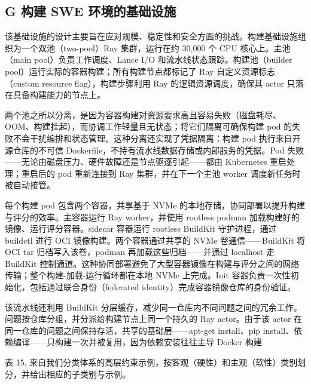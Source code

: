 \subsection{G 构建 SWE 环境的基础设施}\label{g-infrastructure-for-building-swe-environments}

该基础设施的设计主要旨在应对规模、稳定性和安全方面的挑战。构建基础设施组织为一个双池（two-pool）Ray 集群，运行在约 30,000 个 CPU 核心上。主池（main pool）负责工作调度、Lance I/O 和流水线状态跟踪。构建池（builder pool）运行实际的容器构建；所有构建节点都标记了 Ray 自定义资源标志（custom resource flag），构建步骤利用 Ray 的逻辑资源调度，确保其 actor 只落在具备构建能力的节点上。

两个池之所以分离，是因为容器构建对资源要求高且容易失败（磁盘耗尽、OOM、构建挂起），而协调工作轻量且无状态；将它们隔离可确保构建 pod 的失败不会干扰编排和状态管理。这种分离还实现了凭据隔离：构建 pod 执行来自开源仓库的不可信 Dockerfile，不持有流水线数据存储或内部服务的凭据。Pod 失败——无论由磁盘压力、硬件故障还是节点驱逐引起——都由 Kubernetes 重启处理；重启后的 pod 重新连接到 Ray 集群，并在下一个主池 worker 调度新任务时被自动接管。

每个构建 pod 包含两个容器，共享基于 NVMe 的本地存储，协同部署以提升构建与评分的效率。主容器运行 Ray worker，并使用 rootless podman 加载构建好的镜像、运行评分容器。sidecar 容器运行 rootless BuildKit 守护进程，通过 buildctl 进行 OCI 镜像构建。两个容器通过共享的 NVMe 卷通信——BuildKit 将 OCI tar 归档写入该卷，podman 再加载这些归档——并通过 localhost 走 BuildKit 控制通道。这种协同部署避免了大型容器镜像在构建与评分之间的网络传输；整个构建-加载-运行循环都在本地 NVMe 上完成。Init 容器负责一次性初始化，包括通过联合身份（federated identity）完成容器镜像仓库的身份验证。

该流水线还利用 BuildKit 分层缓存，减少同一仓库内不同问题之间的冗余工作。问题按仓库分组，并分派给构建节点上同一个持久的 Ray actor。由于该 actor 在同一仓库的问题之间保持存活，共享的基础层——apt-get install、pip install、依赖编译——只构建一次并被复用，因为依赖安装往往主导 Docker 构建



表 15. 来自我们分类体系的高层约束示例，按客观（硬性）和主观（软性）类别划分，并给出相应的子类别与示例。

